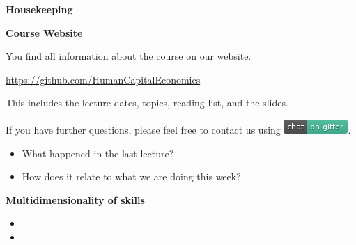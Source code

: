 \begin{frame}\begin{center}
		\LARGE\textbf{Housekeeping}
\end{center}\end{frame}
\begin{frame}
	\textbf{Course Website}\vspace{0.3cm}

You find all information about the course on our website.

\begin{center}
\url{https://github.com/HumanCapitalEconomics}
\end{center}

This includes the lecture dates, topics, reading list, and the slides.\vspace{0.3cm}

If you have further questions, please feel free to contact us using
\includegraphics[scale=0.5]{../../shared/fig-gitter}.

\end{frame}
\begin{frame}

\begin{itemize}\setlength\itemsep{1em}
\item What happened in the last lecture?
\item How does it relate to what we are doing this week?
\end{itemize}

\end{frame}
\begin{frame}
\textbf{Multidimensionality of skills}\vspace{0.3cm}

\begin{itemize}
\item {}
\item {}
\end{itemize}


\end{frame}
